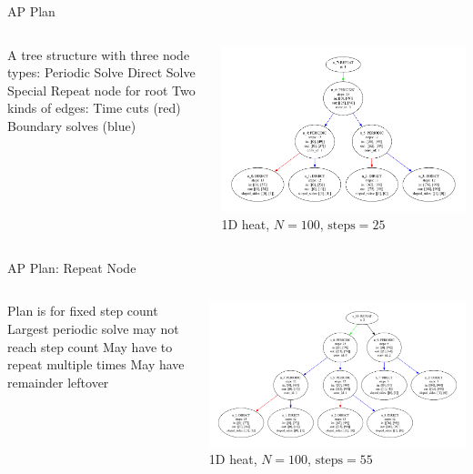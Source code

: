 \begin{frame}{AP Plan}
  \begin{columns}
  \begin{outline}
  \1 A tree structure with three node types:
  \2 Periodic Solve
  \2 Direct Solve
  \2 Special Repeat node for root
  \1 Two kinds of edges:
  \2 Time cuts (red)
  \2 Boundary solves (blue)
  \end{outline}

  \begin{center}
  \centering
  \includegraphics[width=\textwidth]{simple_1d_plan.pdf}
  1D heat, $N = 100$, $\text{steps} = 25$
  \end{center}
\end{columns}
\end{frame}

\begin{frame}{AP Plan: Repeat Node}
  \begin{columns}
  \begin{outline}
  \1 Plan is for fixed step count
  \1 Largest periodic solve may not reach step count
  \2 May have to repeat multiple times
  \2 May have remainder leftover
  \end{outline}

  \begin{center}
  \centering
  \includegraphics[width=\textwidth]{simple_1d_plan_repeat.pdf}
  1D heat, $N = 100$, $\text{steps} = 55$
  \end{center}
\end{columns}
\end{frame}

